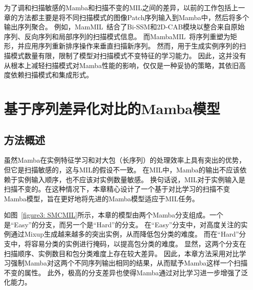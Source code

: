 为了调和扫描敏感的Mamba和扫描不变的MIL之间的差异，以前的工作包括上一章的方法都主要是将不同扫描模式的图像Patch序列输入到Mamba中，然后将多个输出序列聚合。
例如，MamMIL~\cite{fang2024mammil}结合了Bi-SSM和2D-CAB模块以整合来自原始序列、反向序列和局部序列的扫描模式信息。
而MambaMIL~\cite{yang2024mambamil}将序列重塑为矩形，并应用序列重新排序操作来垂直扫描新序列。
然而，用于生成实例序列的扫描模式数量有限，限制了模型对扫描模式不变特征的学习能力。
因此，这并没有从根本上减轻扫描模式对Mamba性能的影响，仅仅是一种妥协的策略，其依旧高度依赖扫描模式和集成形式。


\section[\hspace{-2pt}基于序列差异化对比的Mamba模型]{{\heiti{} \hspace{-8pt}基于序列差异化对比的Mamba模型}}\label{section4: 基于序列差异化对比的Mamba模型}

\subsection[\hspace{-2pt}方法概述]{{\heiti{} \hspace{-8pt}方法概述}}\label{section4: 方法概述}

虽然Mamba在实例特征学习和对大包（长序列）的处理效率上具有突出的优势，但它是扫描敏感的，这与MIL的假设不一致。
在MIL中，Mamba的输出不应该依赖于实例输入顺序，也不应该对实例数量敏感。
换句话说，MIL对于实例输入是扫描不变的。在这种情况下，本章精心设计了一个基于对比学习的扫描不变Mamba模型，旨在更好地将先进的Mamba模型适应于MIL任务。

如图~\ref{figure3: SMCMIL}所示，本章的模型由两个Mamba分支组成。一个是“Easy”的分支，而另一个是“Hard”的分支。
在“Easy”分支中，对高度关注的实例通过Mixup生成越来越多的突出实例，从而降低包分类的难度。
而在“Hard”分支中，将容易分类的实例进行掩码，以提高包分类的难度。
显然，这两个分支在扫描顺序、实例数目和包分类难度上存在较大差异。
因此，本章方法采用对比学习强制Mamba对这两个不同序列输出相同的结果，从而赋予Mamba这样一个扫描不变的属性。
此外，极高的分支差异也使得Mamba通过对比学习进一步增强了泛化能力。

